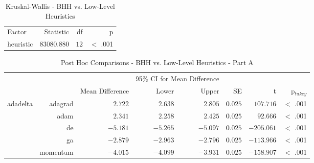 \begin{table}[H]
	\centering
	\caption{Kruskal-Wallis - BHH vs. Low-Level Heuristics}
	\label{tab:results:standalone:kruskal}%
	\par\bigskip
	\resizebox{0.4\textwidth}{!}
	{
		\begin{tabular}{lrrr}
			\toprule
			Factor    & Statistic   & df   & p        \\
			\cmidrule[0.4pt]{1-4}
			heuristic & $83080.880$ & $12$ & $<$ .001 \\
			\bottomrule
		\end{tabular}
	}
\end{table}

\begin{table}[H]
	\centering
	\caption{Post Hoc Comparisons - BHH vs. Low-Level Heuristics - Part A}
	\label{tab:results:standalone:post_hoc}%
	\par\bigskip
	\resizebox{\textwidth}{!}
	{
		\begin{tabular}{lrrrrrrr}
			\toprule
			\multicolumn{1}{c}{} & \multicolumn{1}{c}{} & \multicolumn{1}{c}{} & \multicolumn{2}{c}{95\% CI for Mean Difference} & \multicolumn{1}{c}{} & \multicolumn{1}{c}{} & \multicolumn{1}{c}{}               \\
			\cline{4-5}
			$ $                  & $ $                  & Mean Difference      & Lower                                           & Upper                & SE                   & t                    & p$_{tukey}$ \\
			\cmidrule[0.4pt]{1-8}
			adadelta             & adagrad              & $2.722$              & $2.638$                                         & $2.805$              & $0.025$              & $107.716$            & $<$ .001    \\
			$ $                  & adam                 & $2.341$              & $2.258$                                         & $2.425$              & $0.025$              & $92.666$             & $<$ .001    \\
			                     & de                   & $-5.181$             & $-5.265$                                        & $-5.097$             & $0.025$              & $-205.061$           & $<$ .001    \\
			                     & ga                   & $-2.879$             & $-2.963$                                        & $-2.796$             & $0.025$              & $-113.966$           & $<$ .001    \\
			                     & momentum             & $-4.015$             & $-4.099$                                        & $-3.931$             & $0.025$              & $-158.907$           & $<$ .001    \\

\end{tabular}}
\end{table}

